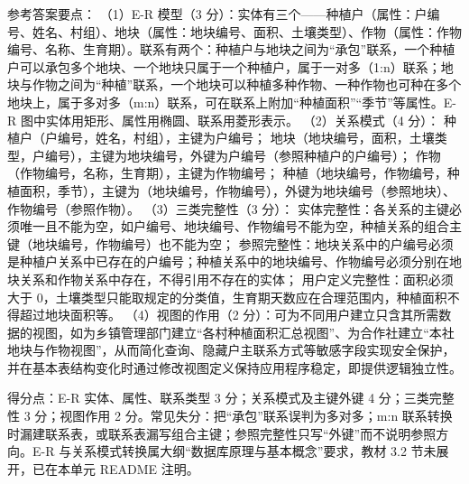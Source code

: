 \documentclass[a4paper,11pt]{article}
\begin{document}
\q 参考答案要点：
（1）E-R 模型（3 分）：实体有三个——种植户（属性：户编号、姓名、村组）、地块（属性：地块编号、面积、土壤类型）、作物（属性：作物编号、名称、生育期）。联系有两个：种植户与地块之间为“承包”联系，一个种植户可以承包多个地块、一个地块只属于一个种植户，属于一对多（1:n）联系；地块与作物之间为“种植”联系，一个地块可以种植多种作物、一种作物也可种在多个地块上，属于多对多（m:n）联系，可在联系上附加“种植面积”“季节”等属性。E-R 图中实体用矩形、属性用椭圆、联系用菱形表示。
（2）关系模式（4 分）：
种植户（户编号，姓名，村组），主键为户编号；
地块（地块编号，面积，土壤类型，户编号），主键为地块编号，外键为户编号（参照种植户的户编号）；
作物（作物编号，名称，生育期），主键为作物编号；
种植（地块编号，作物编号，种植面积，季节），主键为（地块编号，作物编号），外键为地块编号（参照地块）、作物编号（参照作物）。
（3）三类完整性（3 分）：
实体完整性：各关系的主键必须唯一且不能为空，如户编号、地块编号、作物编号不能为空，种植关系的组合主键（地块编号，作物编号）也不能为空；
参照完整性：地块关系中的户编号必须是种植户关系中已存在的户编号；种植关系中的地块编号、作物编号必须分别在地块关系和作物关系中存在，不得引用不存在的实体；
用户定义完整性：面积必须大于 0，土壤类型只能取规定的分类值，生育期天数应在合理范围内，种植面积不得超过地块面积等。
（4）视图的作用（2 分）：可为不同用户建立只含其所需数据的视图，如为乡镇管理部门建立“各村种植面积汇总视图”、为合作社建立“本社地块与作物视图”，从而简化查询、隐藏户主联系方式等敏感字段实现安全保护，并在基本表结构变化时通过修改视图定义保持应用程序稳定，即提供逻辑独立性。
\begin{analysis}得分点：E-R 实体、属性、联系类型 3 分；关系模式及主键外键 4 分；三类完整性 3 分；视图作用 2 分。常见失分：把“承包”联系误判为多对多；m:n 联系转换时漏建联系表，或联系表漏写组合主键；参照完整性只写“外键”而不说明参照方向。E-R 与关系模式转换属大纲“数据库原理与基本概念”要求，教材 3.2 节未展开，已在本单元 README 注明。\end{analysis}
\end{document}
